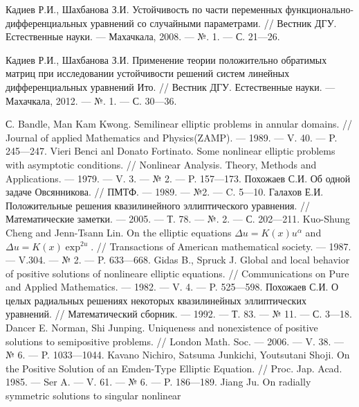 \begin{thebibliography}{111}
	Кадиев Р.И., Шахбанова З.И. Устойчивость по части переменных функционально-дифференциальных уравнений со случайными параметрами. // Вестник ДГУ. Естественные науки. ---  Махачкала, 2008. --- №. 1. --- С. 21---26.
	
	Кадиев Р.И., Шахбанова З.И. Применение теории положительно обратимых матриц при исследовании устойчивости решений
	систем линейных дифференциальных уравнений Ито. // Вестник ДГУ. Естественные науки. --- Махачкала, 2012. --- №. 1. --- С. 30---36.












 С. Bandle, Man Kam Kwong. Semilinear elliptic problems in annular domains. // Journal of applied Mathematics and Physics(ZAMP). --- 1989. --- V. 40. --- P. 245---247.
 Vieri Benci anl Donato Fortinato. Some nonlinear elliptic problems
with asymptotic conditions. // Nonlinear Analysis. Theory, Methods
and Applications. --- 1979. --- V. 3. --- № 2. --- P. 157---173.
 Похожаев С.И. Об одной задаче Овсянникова. // ПМТФ. --- 1989. --- №2. --- C. 5---10.
Галахов Е.И. Положительные решения квазилинейного эллиптического
уравнения. // Математические заметки. --- 2005. --- Т. 78. --- №. 2. --- С. 202---211.
 Kuo-Shung Cheng and Jenn-Tsann Lin. On the elliptic equations
$ \Delta u=K(x)u^{\alpha} $   and $ \Delta u=K(x)\exp^{2u} $. // Transactions of American mathematical society. --- 1987. --- V.304. --- № 2. --- P. 633---668.
 Gidas B., Spruck  J.  Global and local behavior of positive solutions
of nonlineare elliptic equations. //  Communications on Pure and
Applied Mathematics. --- 1982. --- V. 4. --- P. 525---598.
Похожаев С.И. О целых радиальных решениях некоторых квазилинейных
эллиптических уравнений. // Математический сборник. --- 1992. --- Т. 83. --- № 11. --- С. 3---18.
Dancer E. Norman, Shi Junping. Uniqueness and nonexistence of
positive solutions to semipositive problems. // London Math. Soc. --- 2006. --- V. 38. --- № 6. --- P. 1033---1044.
Kavano Nichiro, Satsuma Junkichi, Youtsutani Shoji. On the Positive
Solution of an Emden-Type Elliptic Equation. // Proc. Jap. Acad.
1985. --- Ser A. --- V. 61. --- № 6. --- P. 186---189.
Jiang Ju. On radially  symmetric solutions to singular nonlinear

\end{thebibliography}
